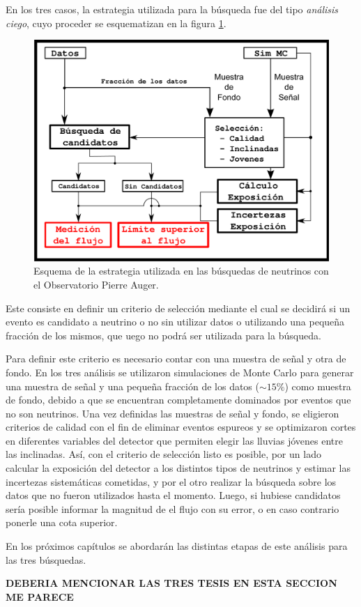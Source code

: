 En los tres casos, la estrategia utilizada para la búsqueda fue del tipo \emph{análisis ciego}, cuyo proceder se esquematizan en la figura \ref{fig:strAuger}.
	\begin{figure}[ht!]
		\centering
		\includegraphics[width=\textwidth]{./fig/estrategiaAuger/analysisSchema}
		\caption{\label{fig:strAuger}
		Esquema de la estrategia utilizada en las búsquedas de neutrinos con el Observatorio Pierre Auger.
		}
	\end{figure}
Este consiste en definir un criterio de selección mediante el cual se decidirá si un evento es candidato a neutrino o no sin utilizar datos o utilizando una pequeña fracción de los mismos, que uego no podrá ser utilizada para la búsqueda.

Para definir este criterio es necesario contar con una muestra de señal y otra de fondo.
En los tres análisis se utilizaron simulaciones de Monte Carlo para generar una muestra de señal y una pequeña fracción de los datos ($\sim15\%$) como muestra de fondo, debido a que se encuentran completamente dominados por eventos que no son neutrinos.
Una vez definidas las muestras de señal y fondo, se eligieron criterios de calidad con el fin de eliminar eventos espureos y se optimizaron cortes en diferentes variables del detector que permiten elegir las lluvias jóvenes entre las inclinadas.
Así, con el criterio de selección listo es posible, por un lado calcular la exposición del detector a los distintos tipos de neutrinos y estimar las incertezas sistemáticas cometidas, y por el otro realizar la búsqueda sobre los datos que no fueron utilizados hasta el momento.
Luego, si hubiese candidatos sería posible informar la magnitud de el flujo con su error, o en caso contrario ponerle una cota superior.

En los próximos capítulos se abordarán las distintas etapas de este análisis para las tres búsquedas.

\textbf{DEBERIA MENCIONAR LAS TRES TESIS EN ESTA SECCION ME PARECE}
